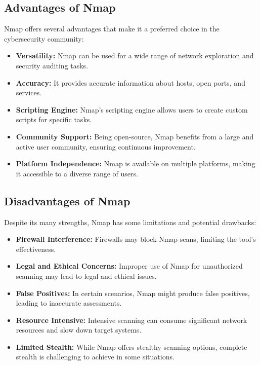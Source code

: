 \documentclass[11pt]{article}
\begin{document}
\subsection{Advantages of Nmap}
Nmap offers several advantages that make it a preferred choice in the cybersecurity community:

\begin{itemize}
    \item \textbf{Versatility:} Nmap can be used for a wide range of network exploration and security auditing tasks.
    \item \textbf{Accuracy:} It provides accurate information about hosts, open ports, and services.
    \item \textbf{Scripting Engine:} Nmap's scripting engine allows users to create custom scripts for specific tasks.
    \item \textbf{Community Support:} Being open-source, Nmap benefits from a large and active user community, ensuring continuous improvement.
    \item \textbf{Platform Independence:} Nmap is available on multiple platforms, making it accessible to a diverse range of users.
\end{itemize}

\subsection{Disadvantages of Nmap}
Despite its many strengths, Nmap has some limitations and potential drawbacks:

\begin{itemize}
    \item \textbf{Firewall Interference:} Firewalls may block Nmap scans, limiting the tool's effectiveness.
    \item \textbf{Legal and Ethical Concerns:} Improper use of Nmap for unauthorized scanning may lead to legal and ethical issues.
    \item \textbf{False Positives:} In certain scenarios, Nmap might produce false positives, leading to inaccurate assessments.
    \item \textbf{Resource Intensive:} Intensive scanning can consume significant network resources and slow down target systems.
    \item \textbf{Limited Stealth:} While Nmap offers stealthy scanning options, complete stealth is challenging to achieve in some situations.
\end{itemize}
\end{document}

